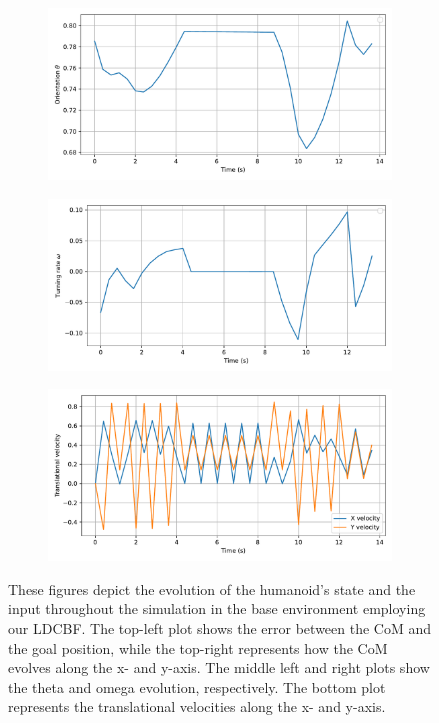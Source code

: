 \begin{figure}[H]
\begin{subfigure}{0.45\linewidth}
        \centering
        \includegraphics[width=\linewidth]{figures/Simulations/sim2unkenv/evolution_2.pdf}
    \end{subfigure}
    \begin{subfigure}{0.45\linewidth}
        \centering
        \includegraphics[width=\linewidth]{figures/Simulations/sim2unkenv/evolution_3.pdf}
    \end{subfigure}
    \hfill
    \begin{subfigure}{0.45\linewidth}
        \centering
        \includegraphics[width=\linewidth]{figures/Simulations/sim2unkenv/evolution_1.pdf}
    \end{subfigure}
    \caption{These figures depict the evolution of the humanoid's state and the input throughout the simulation in the base environment employing our LDCBF. The top-left plot shows the error between the CoM and the goal position, while the top-right represents how the CoM evolves along the x- and y-axis. The middle left and right plots show the theta and omega evolution, respectively. The bottom plot represents the translational velocities along the x- and y-axis.}
    \label{fig:unk_env_evol}
\end{figure}